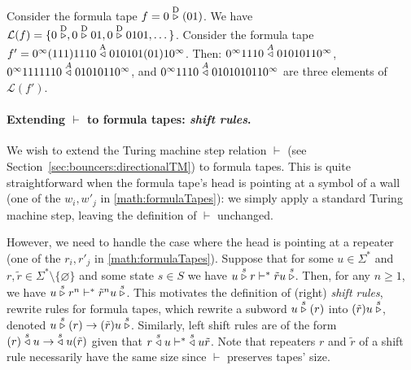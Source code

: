 \begin{example}\label{ex:formulaTapes}
    Consider the formula tape $f = 0 \stackrel{\text{D}}\triangleright (01)$. We have $\mathcal{L}(f) = \{0\stackrel{\text{D}}\triangleright,0\stackrel{\text{D}}\triangleright01,0\stackrel{\text{D}}\triangleright0101,\dots\}$. Consider the formula tape $f'=0^\infty(111)1110 \stackrel{\text{A}}\triangleleft 010101(01)10^\infty$. Then: $0^\infty 1110 \stackrel{A}\triangleleft 01010110^\infty$, $0^\infty 1111110 \stackrel{A}\triangleleft 01010110^\infty$, and $0^\infty 1110 \stackrel{A}\triangleleft 0101010110^\infty$ are three elements of $\mathcal{L}(f')$.
\end{example}





\paragraph*{Extending $\vdash$ to formula tapes: \textit{shift rules}.} We wish to extend the Turing machine step relation $\vdash$ (see Section~\ref{sec:bouncers:directionalTM}) to formula tapes. This is quite straightforward when the formula tape's head is pointing at a symbol of a wall (one of the $w_i, w'_j$ in \eqref{math:formulaTapes}): we simply apply a standard Turing machine step, leaving the definition of $\vdash$ unchanged.

However, we need to handle the case where the head is pointing at a repeater (one of the $r_i, r'_j$ in \eqref{math:formulaTapes}). Suppose that for some $u\in\Sigma^*$ and $r,\tilde{r}\in\Sigma^*\setminus\{\varnothing\}$ and some state $s\in S$ we have $u \stackrel{s}\triangleright r \vdash^* \tilde{r} u \stackrel{s}\triangleright$. Then, for any $n\geq 1$, we have $u \stackrel{s}\triangleright r^n \vdash^* \tilde{r}^n u \stackrel{s}\triangleright$. This motivates the definition of
(right) \textit{shift rules}, rewrite rules for formula tapes, which rewrite a subword $u \stackrel{s}\triangleright(r)$ into $(\tilde{r})u\stackrel{s}\triangleright$, denoted $u \stackrel{s}\triangleright(r) \to (\tilde{r})u\stackrel{s}\triangleright$. Similarly, left shift rules are of the form $(r)\stackrel{s}\triangleleft u \to \;\stackrel{s}\triangleleft u(\tilde{r})$ given that $r\stackrel{s}\triangleleft u \vdash^* \;\stackrel{s}\triangleleft u\tilde{r}$. Note that repeaters $r$ and $\tilde{r}$ of a shift rule necessarily have the same size since $\vdash$ preserves tapes' size.

